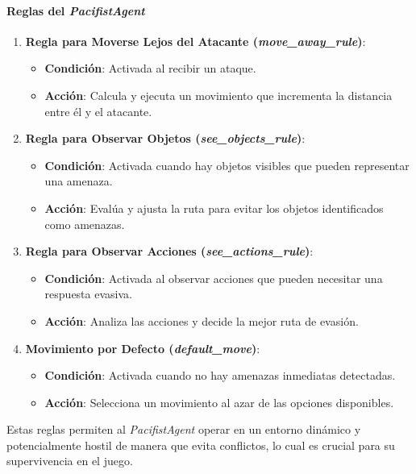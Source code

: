 \documentclass[11pt]{article}
\begin{document}
\paragraph{Reglas del \textit{PacifistAgent}}
\begin{enumerate}
    \item \textbf{Regla para Moverse Lejos del Atacante (\textit{move\_away\_rule})}:
          \begin{itemize}
              \item \textbf{Condición}: Activada al recibir un ataque.
              \item \textbf{Acción}: Calcula y ejecuta un movimiento que incrementa la distancia entre él y el atacante.
          \end{itemize}
    \item \textbf{Regla para Observar Objetos (\textit{see\_objects\_rule})}:
          \begin{itemize}
              \item \textbf{Condición}: Activada cuando hay objetos visibles que pueden representar una amenaza.
              \item \textbf{Acción}: Evalúa y ajusta la ruta para evitar los objetos identificados como amenazas.
          \end{itemize}
    \item \textbf{Regla para Observar Acciones (\textit{see\_actions\_rule})}:
          \begin{itemize}
              \item \textbf{Condición}: Activada al observar acciones que pueden necesitar una respuesta evasiva.
              \item \textbf{Acción}: Analiza las acciones y decide la mejor ruta de evasión.
          \end{itemize}
    \item \textbf{Movimiento por Defecto (\textit{default\_move})}:
          \begin{itemize}
              \item \textbf{Condición}: Activada cuando no hay amenazas inmediatas detectadas.
              \item \textbf{Acción}: Selecciona un movimiento al azar de las opciones disponibles.
          \end{itemize}
\end{enumerate}

Estas reglas permiten al \textit{PacifistAgent} operar en un entorno dinámico y potencialmente hostil de manera que evita conflictos, lo cual es crucial para su supervivencia en el juego.
\end{document}
